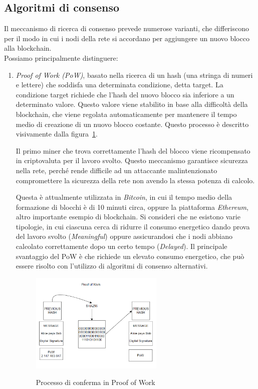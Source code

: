 \subsection{Algoritmi di consenso}\label{sec:tecnologie-blockchain-algoritmi}
Il meccanismo di ricerca di consenso prevede numerose varianti, che differiscono per il modo in cui i nodi della rete si accordano per aggiungere un nuovo blocco alla blockchain.\\
Possiamo principalmente distinguere:
\begin{enumerate}
    \item\textit{{Proof of Work (PoW)}}, basato nella ricerca di un hash (una stringa di numeri e lettere) che soddisfa una determinata condizione, detta target. La condizione target richiede 
    che l'hash del nuovo blocco sia inferiore a un determinato valore. Questo valore viene stabilito in base alla difficoltà della blockchain, che viene regolata automaticamente per mantenere 
    il tempo medio di creazione di un nuovo blocco costante. Questo processo è descritto visivamente dalla figura~\ref{fig:pow}.

    Il primo miner che trova correttamente l'hash del blocco viene ricompensato in criptovaluta per il lavoro svolto.
    Questo meccanismo garantisce sicurezza nella rete, perché rende difficile ad un attaccante malintenzionato
    compromettere la sicurezza della rete non avendo la stessa potenza di calcolo.
    
    Questa è attualmente utilizzata in \textit{Bitcoin}, in cui il tempo medio della formazione di blocchi è di 10 minuti circa, oppure la piattaforma \textit{Ethereum}, altro importante esempio di blockchain.
    Si consideri che ne esistono varie tipologie, in cui ciascuna cerca di ridurre il consumo energetico dando prova del lavoro svolto (\textit{Meaningful}) oppure assicurandosi che
    i nodi abbiano calcolato correttamente dopo un certo tempo (\textit{Delayed}).
    Il principale svantaggio del PoW è che richiede un elevato consumo energetico, che può essere risolto con l'utilizzo di algoritmi di consenso alternativi.

    \begin{figure}[h]
        \centering
        \includegraphics[width=0.6\textwidth, alt={Come avviene il processo di conferma in Proof of Work}]{immagini/proof-of-work.png}
        \caption{Processo di conferma in Proof of Work}\label{fig:pow}
    \end{figure}


\end{enumerate}
